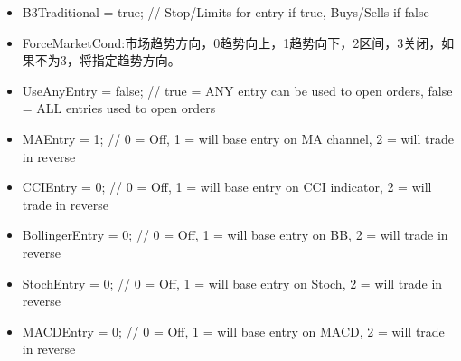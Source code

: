 \begin{itemize}
\item B3Traditional       = true;     // Stop/Limits for entry if true, Buys/Sells if false
\item ForceMarketCond:市场趋势方向，0趋势向上，1趋势向下，2区间，3关闭，如果不为3，将指定趋势方向。
\item UseAnyEntry         = false;    // true = ANY entry can be used to open orders, false = ALL entries used to open orders
\item MAEntry             = 1;        // 0 = Off, 1 = will base entry on MA channel, 2 = will trade in reverse
\item CCIEntry            = 0;        // 0 = Off, 1 = will base entry on CCI indicator, 2 = will trade in reverse
\item BollingerEntry      = 0;        // 0 = Off, 1 = will base entry on BB, 2 = will trade in reverse
\item StochEntry          = 0;        // 0 = Off, 1 = will base entry on Stoch, 2 = will trade in reverse
\item MACDEntry           = 0;        // 0 = Off, 1 = will base entry on MACD, 2 = will trade in reverse


\end{itemize}
